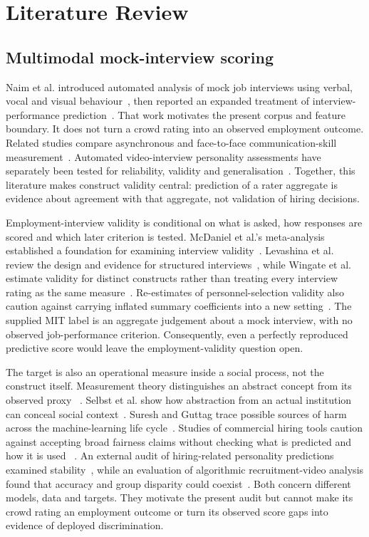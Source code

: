 \chapter{Literature Review}
\label{ch:literature-review}

\section{Multimodal mock-interview scoring}

Naim et al. introduced automated analysis of mock job interviews using verbal, vocal and visual
behaviour~\cite{Naim2015}, then reported an expanded treatment of interview-performance
prediction~\cite{Naim2018}. That work motivates the present corpus and feature boundary. It does
not turn a crowd rating into an observed employment outcome. Related studies compare asynchronous
and face-to-face communication-skill measurement~\cite{Rasipuram2016}. Automated video-interview
personality assessments have separately been tested for reliability, validity and
generalisation~\cite{Hickman2022}. Together, this literature makes construct validity central:
prediction of a rater aggregate is evidence about agreement with that aggregate, not validation of
hiring decisions.

Employment-interview validity is conditional on what is asked, how responses are scored and
which later criterion is tested. McDaniel et al.'s meta-analysis established a foundation for
examining interview validity~\cite{McDaniel1994InterviewValidity}. Levashina et al. review the
design and evidence for structured interviews~\cite{Levashina2014Structured}, while Wingate et
al. estimate validity for distinct constructs rather than treating every interview rating as the
same measure~\cite{Wingate2025ConstructValidity}.
Re-estimates of personnel-selection validity also caution against carrying inflated summary
coefficients into a new setting~\cite{Sackett2022Validity}. The supplied MIT label is an
aggregate judgement about a mock interview, with no observed job-performance criterion.
Consequently, even a perfectly reproduced predictive score would leave the employment-validity
question open.

The target is also an operational measure inside a social process, not the construct itself.
Measurement theory distinguishes an abstract concept from its observed proxy
~\cite{JacobsWallach2021}. Selbst et al. show how abstraction from an actual institution can
conceal social context~\cite{Selbst2019}. Suresh and Guttag trace possible sources of harm across
the machine-learning life cycle~\cite{SureshGuttag2021}. Studies of commercial hiring tools
caution against accepting broad fairness claims without checking what is predicted and how it is used
~\cite{Raghavan2020}. An external audit of hiring-related personality predictions examined
stability~\cite{Rhea2022}, while an evaluation of algorithmic recruitment-video analysis found
that accuracy and group disparity could coexist~\cite{Kochling2021}. Both concern different models,
data and targets. They motivate the present audit but cannot make its crowd rating an employment
outcome or turn its observed score gaps into evidence of deployed discrimination.

